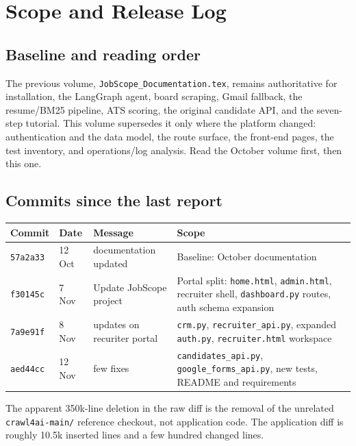 \documentclass[11pt,a4paper]{article}
\newcommand{\file}[1]{\texttt{\small #1}}
\begin{document}
\tableofcontents
\clearpage

\section{Scope and Release Log}
\label{u:scope}

\subsection{Baseline and reading order}
The previous volume, \file{JobScope\_Documentation.tex}, remains authoritative
for installation, the LangGraph agent, board scraping, Gmail fallback, the
resume/BM25 pipeline, ATS scoring, the original candidate API, and the
seven-step tutorial. This volume supersedes it only where the platform changed:
authentication and the data model, the route surface, the front-end pages, the
test inventory, and operations/log analysis. Read the October volume first,
then this one.

\subsection{Commits since the last report}
\begin{center}
\begin{tabular}{@{}lllp{7.4cm}@{}}
\toprule
\textbf{Commit} & \textbf{Date} & \textbf{Message} & \textbf{Scope}\\
\midrule
\texttt{57a2a33} & 12 Oct & documentation updated & Baseline: October documentation\\
\texttt{f30145c} & 7 Nov & Update JobScope project &
  Portal split: \file{home.html}, \file{admin.html}, recruiter shell,
  \file{dashboard.py} routes, auth schema expansion\\
\texttt{7a9e91f} & 8 Nov & updates on recuriter portal &
  \file{crm.py}, \file{recruiter\_api.py}, expanded \file{auth.py},
  \file{recruiter.html} workspace\\
\texttt{aed44cc} & 12 Nov & few fixes &
  \file{candidates\_api.py}, \file{google\_forms\_api.py}, new tests,
  README and requirements\\
\bottomrule
\end{tabular}
\end{center}

The apparent 350k-line deletion in the raw diff is the removal of the
unrelated \file{crawl4ai-main/} reference checkout, not application code. The
application diff is roughly 10.5k inserted lines and a few hundred changed
lines.
\end{document}
